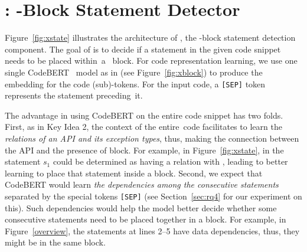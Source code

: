 \section{{\xstate}: -Block Statement Detector}
\label{sec:xstate}


Figure~\ref{fig:xstate} illustrates the architecture of {\xstate}, the
-block statement detection component.
The goal of {\xstate} is to decide if a
statement in the given code snippet needs to be placed within~a~
block. For code representation learning, we use one single
CodeBERT~\cite{codebert-emnlp20} model as in {\xblock} (see
Figure~\ref{fig:xblock}) to produce the embedding for the code
(sub)-tokens. For the input code, a \texttt{[SEP]} token represents
the statement preceding~it.

The advantage in using CodeBERT on the entire code snippet has two
folds. First, as in Key Idea 2, the context of the entire~code
facilitates {\tool} to learn the {\em relations of an API and its
  exception types}, thus, making the connection between the API and
the presence of  block. For example, in
Figure~\ref{fig:xstate},  in the statement $s_1$ could be
determined as having a relation with ,
leading to better learning to place that statement inside a
 block. Second, we expect that CodeBERT would learn
     {\em the dependencies among the consecutive statements} separated
     by the special tokens \texttt{[SEP]} (see Section~\ref{sec:rq4} for our
     experiment on this). Such dependencies would help the model better
     decide whether some consecutive statements need to be placed
     together in a  block. For example, in
     Figure~\ref{overview}, the statements at lines 2--5 have data
     dependencies, thus, they might be in the same 
     block.

